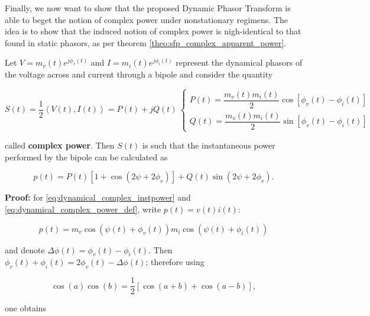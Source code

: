 	Finally, we now want to show that the proposed Dynamic Phasor Transform is able to beget the notion of complex power under nonstationary regimens. The idea is to show that the induced notion of complex power is nigh-identical to that found in static phasors, as per theorem \ref{theo:sfp_complex_apparent_power}.

\begin{theorem}\label{theo:activereactivepower} %
	Let $V = m_v(t)e^{j\phi_v(t)}$ and $I = m_i(t)e^{j\phi_i(t)}$ represent the dynamical phasors of the voltage across and current through a bipole and consider the quantity 

\begin{equation} S(t) = \frac{1}{2}\left<V(t),I(t)\right> = P(t) + jQ(t)\ \left\{\begin{array}{l} P(t) = \dfrac{m_v(t)m_i(t)}{2}\cos\left[\phi_v(t) - \phi_i(t)\right] \\[3mm] Q(t) = \dfrac{m_v(t)m_i(t)}{2}\sin\left[\phi_v(t) - \phi_i(t)\right] \end{array}\right. \label{eq:dynamical_complex_power_def}\end{equation}

	\noindent called \textbf{complex power}. Then $S(t)$ is such that the instantaneous power performed by the bipole can be calculated as

\begin{equation} p(t) = P(t) \left[1 + \cos\left(2\psi + 2\phi_v\right) \right] + Q(t) \sin\left(2\psi + 2\phi_v\right). \label{eq:dynamical_complex_instpower}\end{equation}

\end{theorem}
\textbf{Proof:} for \eqref{eq:dynamical_complex_instpower} and \eqref{eq:dynamical_complex_power_def}, write $p(t) = v(t)i(t)$:

\begin{equation} p(t) = m_v\cos\left(\psi(t) + \phi_v(t)\right)m_i\cos\left(\psi(t) + \phi_i(t)\right) \end{equation} 

	\noindent and denote $\Delta\phi(t) = \phi_v(t) - \phi_i(t)$. Then $\phi_v(t) + \phi_i(t) = 2\phi_v(t) - \Delta\phi(t)$; therefore using

\begin{equation} \cos(a)\cos(b) = \dfrac{1}{2}\left[\cos(a+b) + \cos(a-b)\right],\end{equation}

	\noindent one obtains

